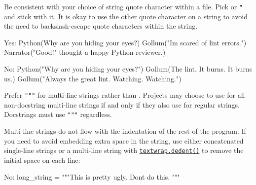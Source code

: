 \documentclass[
]{article}
\newenvironment{Shaded}{}{}
\newcommand{\NormalTok}[1]{#1}
\newcommand{\OperatorTok}[1]{\textcolor[rgb]{0.40,0.40,0.40}{#1}}
\newcommand{\StringTok}[1]{\textcolor[rgb]{0.25,0.44,0.63}{#1}}
\begin{document}
Be consistent with your choice of string quote character within a file.
Pick \texttt{\textquotesingle{}} or \texttt{"} and stick with it. It is
okay to use the other quote character on a string to avoid the need to
backslash-escape quote characters within the string.

\begin{samepage}
\begin{Shaded}
\begin{Highlighting}[]
\NormalTok{Yes:}
\NormalTok{  Python(}\StringTok{\textquotesingle{}Why are you hiding your eyes?\textquotesingle{}}\NormalTok{)}
\NormalTok{  Gollum(}\StringTok{"I\textquotesingle{}m scared of lint errors."}\NormalTok{)}
\NormalTok{  Narrator(}\StringTok{\textquotesingle{}"Good!" thought a happy Python reviewer.\textquotesingle{}}\NormalTok{)}
\end{Highlighting}
\end{Shaded}
\end{samepage}

\begin{samepage}
\begin{Shaded}
\begin{Highlighting}[]
\NormalTok{No:}
\NormalTok{  Python(}\StringTok{"Why are you hiding your eyes?"}\NormalTok{)}
\NormalTok{  Gollum(}\StringTok{\textquotesingle{}The lint. It burns. It burns us.\textquotesingle{}}\NormalTok{)}
\NormalTok{  Gollum(}\StringTok{"Always the great lint. Watching. Watching."}\NormalTok{)}
\end{Highlighting}
\end{Shaded}
\end{samepage}

Prefer \texttt{"""} for multi-line strings rather than
\texttt{\textquotesingle{}\textquotesingle{}\textquotesingle{}}.
Projects may choose to use
\texttt{\textquotesingle{}\textquotesingle{}\textquotesingle{}} for all
non-docstring multi-line strings if and only if they also use
\texttt{\textquotesingle{}} for regular strings. Docstrings must use
\texttt{"""} regardless.

Multi-line strings do not flow with the indentation of the rest of the
program. If you need to avoid embedding extra space in the string, use
either concatenated single-line strings or a multi-line string with
\href{https://docs.python.org/3/library/textwrap.html\#textwrap.dedent}{\texttt{textwrap.dedent()}}
to remove the initial space on each line:

\begin{samepage}
\begin{Shaded}
\begin{Highlighting}[]
\NormalTok{  No:}
\NormalTok{  long\_string }\OperatorTok{=} \StringTok{"""This is pretty ugly.}
\StringTok{Don\textquotesingle{}t do this.}
\StringTok{"""}
\end{Highlighting}
\end{Shaded}
\end{samepage}
\end{document}
